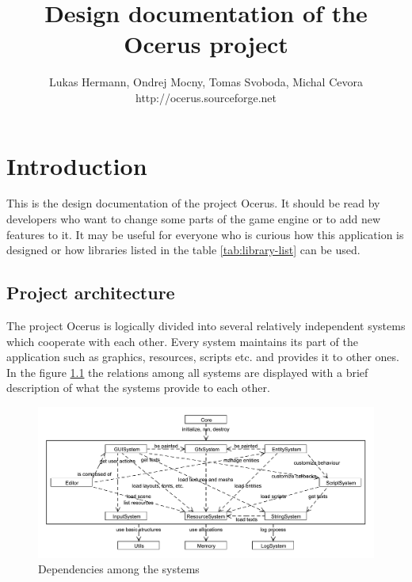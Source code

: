 \documentclass[a4paper, 12pt]{report}
\begin{document}
\pagestyle{empty} %

\title{Design documentation of the Ocerus project}
\author{Lukas Hermann, Ondrej Mocny, Tomas Svoboda, Michal Cevora\\http://ocerus.sourceforge.net}
\maketitle

\pagestyle{plain} %
\setcounter{page}{2}

\tableofcontents %
\cleardoublepage %

\chapter{Introduction}

This is the design documentation of the project Ocerus. It should be read by developers who want to change some parts of the game engine or to add new features to it. It may be useful for everyone who is curious how this application is designed or how libraries listed in the table \ref{tab:library-list} can be used.

\section{Project architecture}

The project Ocerus is logically divided into several relatively independent systems which cooperate with each other. Every system maintains its part of the application such as graphics, resources, scripts etc. and provides it to other ones. In the figure \ref{fig:system-connection} the relations among all systems are displayed with a brief description of what the systems provide to each other.

\begin{figure}[htbp]
	\centering
		\includegraphics[width=1\textwidth]{SystemConnection.pdf}
	\caption{Dependencies among the systems}
	\label{fig:system-connection}
\end{figure}
\end{document}
